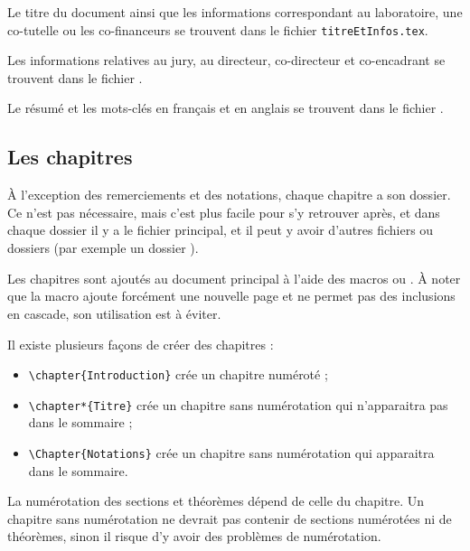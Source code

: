 Le titre du document ainsi que les informations correspondant au laboratoire, une co-tutelle ou les co-financeurs se trouvent dans le fichier \texttt{titreEtInfos.tex}.

Les informations relatives au jury, au directeur, co-directeur et co-encadrant se trouvent dans le fichier .

Le résumé et les mots-clés en français et en anglais se trouvent dans le fichier .

\subsection{Les chapitres}
À l'exception des remerciements et des notations, chaque chapitre a son dossier.
Ce n'est pas nécessaire, mais c'est plus facile pour s'y retrouver après, et dans chaque dossier il y a le fichier principal, et il peut y avoir d'autres fichiers ou dossiers (par exemple un dossier ).

Les chapitres sont ajoutés au document principal à l'aide des macros \verb|| ou \verb||. À noter que la macro \verb|| ajoute forcément une nouvelle page et ne permet pas des inclusions en cascade, son utilisation est à éviter.

Il existe plusieurs façons de créer des chapitres :
\begin{itemize}
  \item \verb|\chapter{Introduction}| crée un chapitre numéroté ;
  \item \verb|\chapter*{Titre}| crée un chapitre sans numérotation qui n'apparaitra pas dans le sommaire ;
  \item \verb|\Chapter{Notations}| crée un chapitre sans numérotation qui apparaitra dans le sommaire.
\end{itemize}

\begin{remark}
  La numérotation des sections et théorèmes dépend de celle du chapitre. Un chapitre sans numérotation ne devrait pas contenir de sections numérotées ni de théorèmes, sinon il risque d'y avoir des problèmes de numérotation.
\end{remark}

